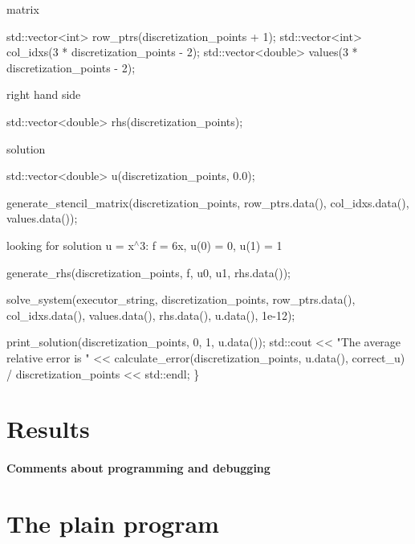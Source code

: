 matrix


\begin{DoxyCode}
std::vector<int> row\_ptrs(discretization\_points + 1);
std::vector<int> col\_idxs(3 * discretization\_points - 2);
std::vector<double> values(3 * discretization\_points - 2);
\end{DoxyCode}


right hand side


\begin{DoxyCode}
std::vector<double> rhs(discretization\_points);
\end{DoxyCode}


solution


\begin{DoxyCode}
std::vector<double> u(discretization\_points, 0.0);

generate\_stencil\_matrix(discretization\_points, row\_ptrs.data(),
                        col\_idxs.data(), values.data());
\end{DoxyCode}


looking for solution u = x$^\wedge$3\+: f = 6x, u(0) = 0, u(1) = 1


\begin{DoxyCode}
    generate\_rhs(discretization\_points, f, u0, u1, rhs.data());

    solve\_system(executor\_string, discretization\_points, row\_ptrs.data(),
                 col\_idxs.data(), values.data(), rhs.data(), u.data(), 1e-12);

    print\_solution(discretization\_points, 0, 1, u.data());
    std::cout << \textcolor{stringliteral}{"The average relative error is "}
              << calculate\_error(discretization\_points, u.data(), correct\_u) /
                     discretization\_points
              << std::endl;
\}
\end{DoxyCode}
 \label{_Results}%
\section*{Results}

\label{_Commentsaboutprogramminganddebugging}%
\paragraph*{Comments about programming and debugging }

\label{_PlainProg}%
 \section*{The plain program}


\begin{DoxyCodeInclude}
\end{DoxyCodeInclude}
 